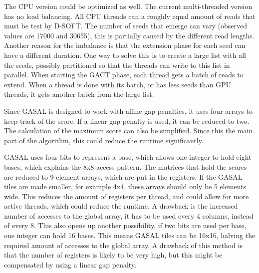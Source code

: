 \documentclass[../thesis.tex]{subfiles}
\begin{document}
The CPU version could be optimized as well.
The current multi-threaded version has no load balancing.
All CPU threads can a roughly equal amount of reads that must be test by D-SOFT.
The number of seeds that emerge can vary (observed values are 17000 and 30655), this is partially caused by the different read lengths.
Another reason for the imbalance is that the extension phase for each seed can have a different duration.
One way to solve this is to create a large list with all the seeds, possibly partitioned so that the threads can write to this list in parallel.
When starting the GACT phase, each thread gets a batch of reads to extend.
When a thread is done with its batch, or has less seeds than GPU threads, it gets another batch from the large list.

Since GASAL is designed to work with affine gap penalties, it uses four arrays to keep track of the score.
If a linear gap penalty is used, it can be reduced to two.
The calculation of the maximum score can also be simplified.
Since this the main part of the algorithm, this could reduce the runtime significantly.

GASAL uses four bits to represent a base, which allows one integer to hold eight bases, which explains the 8x8 access pattern.
The matrices that hold the scores are reduced to 9-element arrays, which are put in the registers.
If the GASAL tiles are made smaller, for example 4x4, these arrays should only be 5 elements wide.
This reduces the amount of registers per thread, and could allow for more active threads, which could reduce the runtime.
A drawback is the increased number of accesses to the global array, it has to be used every 4 columns, instead of every 8.
This also opens up another possibility, if two bits are used per base, one integer can hold 16 bases.
This means GASAL tiles can be 16x16, halving the required amount of accesses to the global array.
A drawback of this method is that the number of registers is likely to be very high, but this might be compensated by using a linear gap penalty.
\end{document}
